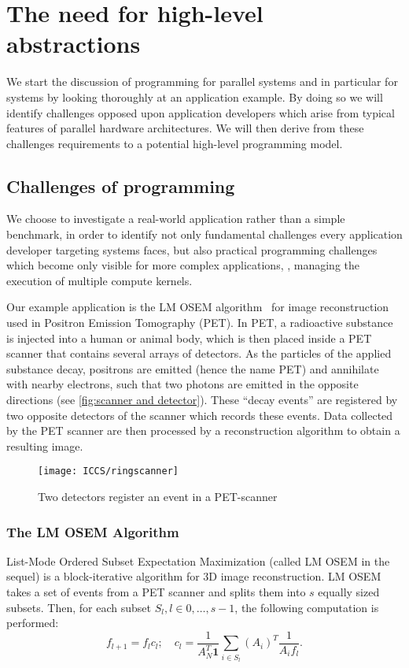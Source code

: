 \section{The need for high-level abstractions}
We start the discussion of programming for parallel systems and in particular for \GPU systems by looking thoroughly at an application example.
By doing so we will identify challenges opposed upon application developers which arise from typical features of parallel hardware architectures.
We will then derive from these challenges requirements to a potential high-level programming model.


\subsection{Challenges of \GPU programming}
\label{section:opencl-example}
We choose to investigate a real-world application rather than a simple benchmark, in order to identify not only fundamental challenges every application developer targeting \GPU systems faces, but also practical programming challenges which become only visible for more complex applications, \eg, managing the execution of multiple compute kernels.

Our example application is the LM OSEM algorithm~\cite{ReaderErFlOt1998, SchellmannGoMeKoScWuBu2009} for image reconstruction used in Positron Emission Tomography (PET).
In PET, a radioactive substance is injected into a human or animal body, which is then placed inside a PET scanner that contains several arrays of detectors.
As the particles of the applied substance decay, positrons are emitted (hence the name PET) and annihilate with nearby electrons, such that two photons are emitted in the opposite directions (see \autoref{fig:scanner and detector}).
These ``decay events'' are registered by two opposite detectors of the scanner which records these events.
Data collected by the PET scanner are then processed by a reconstruction algorithm to obtain a resulting image.

\begin{figure}
  \centering
  \texttt{[image: ICCS/ringscanner]}
  \caption{Two detectors register an event in a PET-scanner}
  \label{fig:scanner and detector}
\end{figure}

\subsubsection{The LM OSEM Algorithm}
List-Mode Ordered Subset Expectation Maximization \cite{ReaderErFlOt1998} (called LM OSEM in the sequel) is a block-iterative algorithm for 3D image reconstruction.
LM OSEM takes a set of events from a PET scanner and splits them into $s$ equally sized subsets.
Then, for each subset $S_l, l \in {0, \ldots, s-1}$, the following computation is performed:
\begin{equation}
  f_{l+1}=f_{l}c_{l};\quad c_{l}=\dfrac{1}{A_N^T \textbf{1}} \sum_{i \in S_{l}} (A_i)^T \dfrac{1}{A_{i} f_{l}}.
\label{equ:lm_osem}
\end{equation}

